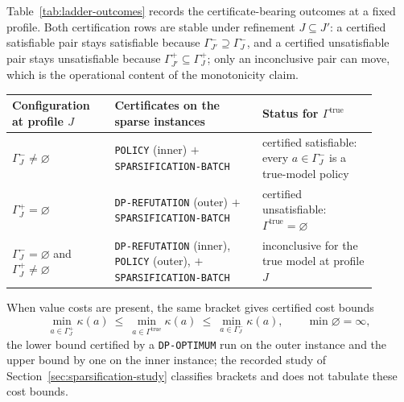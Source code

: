 \documentclass[11pt]{article}
\theoremstyle{plain}
\theoremstyle{definition}
\theoremstyle{remark}
\begin{document}
Table~\ref{tab:ladder-outcomes} records the certificate-bearing outcomes
at a fixed profile.  Both certification rows are stable under refinement
\(J\subseteq J'\): a certified satisfiable pair stays satisfiable because
\(\Gamma^-_{J'}\supseteq\Gamma^-_J\), and a certified unsatisfiable pair
stays unsatisfiable because \(\Gamma^+_{J'}\subseteq\Gamma^+_J\); only an
inconclusive pair can move, which is the operational content of the
monotonicity claim.

\begin{center}
\footnotesize
\begin{tabular}{@{}p{0.25\linewidth}p{0.36\linewidth}p{0.29\linewidth}@{}}
\toprule
Configuration at profile \(J\) & Certificates on the sparse instances &
Status for \(\Gamma^{\mathrm{true}}\)\\
\midrule
\(\Gamma^-_J\ne\varnothing\) & \texttt{POLICY} (inner) \(+\)
\texttt{SPARSIFICATION-\allowbreak BATCH} & certified satisfiable: every
\(a\in\Gamma^-_J\) is a true-model policy\\
\(\Gamma^+_J=\varnothing\) & \texttt{DP-REFUTATION} (outer) \(+\)
\texttt{SPARSIFICATION-\allowbreak BATCH} & certified unsatisfiable:
\(\Gamma^{\mathrm{true}}=\varnothing\)\\
\(\Gamma^-_J=\varnothing\) and \(\Gamma^+_J\ne\varnothing\) &
\texttt{DP-REFUTATION} (inner), \texttt{POLICY} (outer), \(+\)
\texttt{SPARSIFICATION-\allowbreak BATCH} & inconclusive for the true model
at profile \(J\)\\
\bottomrule
\end{tabular}
\label{tab:ladder-outcomes}
\end{center}

When value costs are present, the same bracket gives certified cost
bounds
\[
  \min_{a\in\Gamma^+_J}\kappa(a)\ \le\
  \min_{a\in\Gamma^{\mathrm{true}}}\kappa(a)\ \le\
  \min_{a\in\Gamma^-_J}\kappa(a),
  \qquad \min\varnothing=\infty,
\]
the lower bound certified by a \texttt{DP-OPTIMUM} run on the outer
instance and the upper bound by one on the inner instance; the recorded
study of Section~\ref{sec:sparsification-study} classifies brackets and
does not tabulate these cost bounds.
\end{document}

